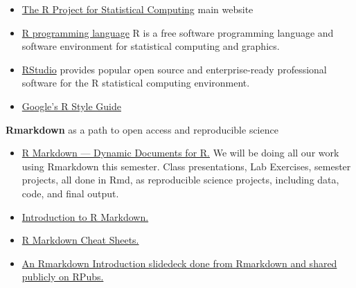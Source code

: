 \documentclass[10pt]{article} %
\begin{document}
      \begin{itemize}
        \item \href{"http://www.r-project.org/index.html"}{The R Project for Statistical Computing}  \cite{r_r_2014} main website
        \item \href{"http://en.wikipedia.org/wiki/R_(programming_language)"}{R programming language}  R is a free software programming language and software environment for statistical computing and graphics.\cite{r_project_r_2014}
        \item \href{"http://www.rstudio.com/"}{ RStudio} provides popular open source and enterprise-ready professional software for the R statistical computing environment. \cite{rstudio_rstudio_2014}
        \item \href{"https://google-styleguide.googlecode.com/svn/trunk/Rguide.xml"}{ Google's R Style Guide}
      \end{itemize}

    {\bf Rmarkdown} as a path to open access and reproducible science

      \begin{itemize}
        \item \href{"http://rmarkdown.rstudio.com/"}{ R Markdown — Dynamic Documents for R.} We will be doing all our work using Rmarkdown this semester.
        Class presentations, Lab Exercises, semester projects, all done in Rmd, as reproducible science projects, including data, code, and final output.
        \item \href{"http://shiny.rstudio.com/articles/rmarkdown.html"}{ Introduction to R Markdown.}
        \item \href{"http://www.rstudio.com/resources/cheatsheets/"}{ R Markdown Cheat Sheets.}
        \item \href{"http://rpubs.com/mansun_kuo/24330"}{ An Rmarkdown Introduction slidedeck done from Rmarkdown and shared publicly on RPubs.}
      \end{itemize}
\end{document}
